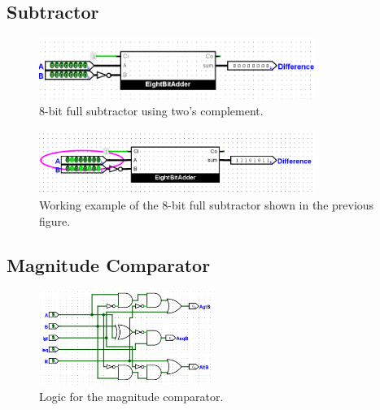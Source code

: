 \documentclass{article}
\begin{document}
\subsection*{Subtractor}

\begin{figure}[H]
    \centering
    \includegraphics[width=0.8\textwidth]{./images/8-bit_subtractor.png}
    \caption{8-bit full subtractor using two's complement.}
\end{figure}

\begin{figure}[H]
    \centering
    \includegraphics[width=0.8\textwidth]{./images/working_8-bit_subtractor.png}
    \caption{Working example of the 8-bit full subtractor shown in the previous figure.}
\end{figure}

\subsection*{Magnitude Comparator}

\begin{figure}[H]
    \centering
    \includegraphics[width=0.5\textwidth]{./images/magnitude_comparator.png}
    \caption{Logic for the magnitude comparator.}
\end{figure}
\end{document}
